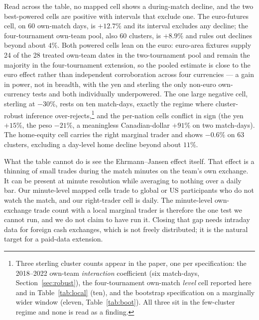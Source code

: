 \documentclass[12pt]{article}
\begin{document}
Read across the table, no mapped cell shows a during-match decline, and the two best-powered cells are positive with intervals that exclude one. The euro-futures cell, on 60 own-match days, is $+12.7\%$ and its interval excludes any decline; the four-tournament own-team pool, also 60 clusters, is $+8.9\%$ and rules out declines beyond about $4\%$. Both powered cells lean on the euro: euro-area fixtures supply 24 of the 28 treated own-team dates in the two-tournament pool and remain the majority in the four-tournament extension, so the pooled estimate is close to the euro effect rather than independent corroboration across four currencies --- a gain in power, not in breadth, with the yen and sterling the only non-euro own-currency tests and both individually underpowered. The one large negative cell, sterling at $-30\%$, rests on ten match-days, exactly the regime where cluster-robust inference over-rejects,\footnote{Three sterling cluster counts appear in the paper, one per specification: the 2018--2022 own-team \emph{interaction} coefficient (six match-days, Section~\ref{sec:robust}), the four-tournament own-match \emph{level} cell reported here and in Table~\ref{tab:local} (ten), and the bootstrap specification on a marginally wider window (eleven, Table~\ref{tab:boot}). All three sit in the few-cluster regime and none is read as a finding.} and the per-nation cells conflict in sign (the yen $+15\%$, the peso $-21\%$, a meaningless Canadian-dollar $+91\%$ on two match-days). The home-equity cell carries the right marginal trader and shows $-0.6\%$ on 63 clusters, excluding a day-level home decline beyond about $11\%$.

What the table cannot do is see the Ehrmann--Jansen effect itself. That effect is a thinning of small trades during the match minutes on the team's own exchange. It can be present at minute resolution while averaging to nothing over a daily bar. Our minute-level mapped cells trade to global or US participants who do not watch the match, and our right-trader cell is daily. The minute-level own-exchange trade count with a local marginal trader is therefore the one test we cannot run, and we do not claim to have run it. Closing that gap needs intraday data for foreign cash exchanges, which is not freely distributed; it is the natural target for a paid-data extension.
\end{document}
